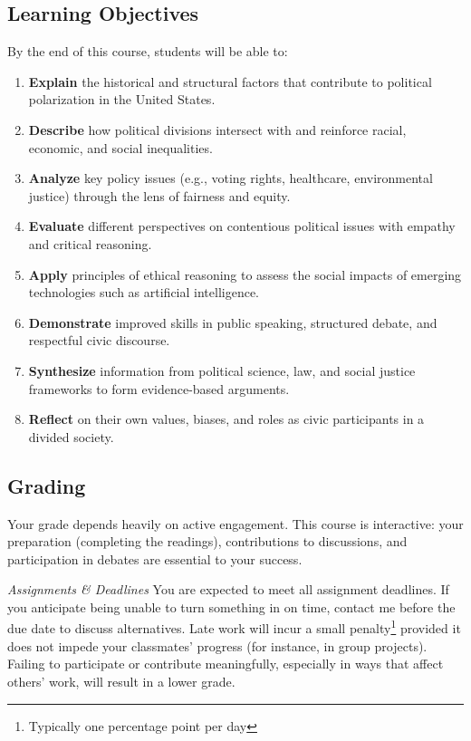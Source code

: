\documentclass[]{tufte-handout}
\providecommand{\tightlist}{%
  \setlength{\itemsep}{0pt}\setlength{\parskip}{0pt}}
\begin{document}
\hypertarget{learning-objectives}{%
\subsection{Learning Objectives}\label{learning-objectives}}

By the end of this course, students will be able to:

\begin{enumerate}
\def\labelenumi{\arabic{enumi}.}
\tightlist
\item
  \textbf{Explain} the historical and structural factors that contribute
  to political polarization in the United States.
\item
  \textbf{Describe} how political divisions intersect with and reinforce
  racial, economic, and social inequalities.
\item
  \textbf{Analyze} key policy issues (e.g., voting rights, healthcare,
  environmental justice) through the lens of fairness and equity.
\item
  \textbf{Evaluate} different perspectives on contentious political
  issues with empathy and critical reasoning.
\item
  \textbf{Apply} principles of ethical reasoning to assess the social
  impacts of emerging technologies such as artificial intelligence.
\item
  \textbf{Demonstrate} improved skills in public speaking, structured
  debate, and respectful civic discourse.
\item
  \textbf{Synthesize} information from political science, law, and
  social justice frameworks to form evidence-based arguments.
\item
  \textbf{Reflect} on their own values, biases, and roles as civic
  participants in a divided society.
\end{enumerate}

\hypertarget{grading}{%
\subsection{Grading}\label{grading}}

Your grade depends heavily on active engagement. This course is
interactive: your preparation (completing the readings), contributions
to discussions, and participation in debates are essential to your
success.

\emph{Assignments \& Deadlines} You are expected to meet all assignment
deadlines. If you anticipate being unable to turn something in on time,
contact me before the due date to discuss alternatives. Late work will
incur a small penalty\footnote{Typically one percentage point per day}
provided it does not impede your classmates' progress (for instance, in
group projects). Failing to participate or contribute meaningfully,
especially in ways that affect others' work, will result in a lower
grade.
\end{document}
